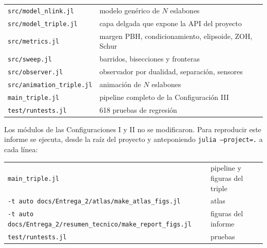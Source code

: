 \documentclass[11pt,letterpaper]{article}
\theoremstyle{definition}
\theoremstyle{plain}
\theoremstyle{remark}
\begin{document}
\begin{center}\small
\begin{tabular}{@{}ll@{}}
\toprule
\texttt{src/model\_nlink.jl} & modelo genérico de $N$ eslabones\\
\texttt{src/model\_triple.jl} & capa delgada que expone la API del proyecto\\
\texttt{src/metrics.jl} & margen PBH, condicionamiento, elipsoide, ZOH, Schur\\
\texttt{src/sweep.jl} & barridos, bisecciones y fronteras\\
\texttt{src/observer.jl} & observador por dualidad, separación, sensores\\
\texttt{src/animation\_triple.jl} & animación de $N$ eslabones\\
\texttt{main\_triple.jl} & pipeline completo de la Configuración III\\
\texttt{test/runtests.jl} & 618 pruebas de regresión\\
\bottomrule
\end{tabular}
\end{center}

Los módulos de las Configuraciones I y II no se modificaron. Para reproducir
este informe se ejecuta, desde la raíz del proyecto y anteponiendo
\texttt{julia --project=.} a cada línea:

\begin{center}\small
\begin{tabular}{@{}ll@{}}
\toprule
\texttt{main\_triple.jl} & pipeline y figuras del triple\\
\texttt{-t auto docs/Entrega\_2/atlas/make\_atlas\_figs.jl} & atlas\\
\texttt{-t auto docs/Entrega\_2/resumen\_tecnico/make\_report\_figs.jl} & figuras del informe\\
\texttt{test/runtests.jl} & pruebas\\
\bottomrule
\end{tabular}
\end{center}
\end{document}
